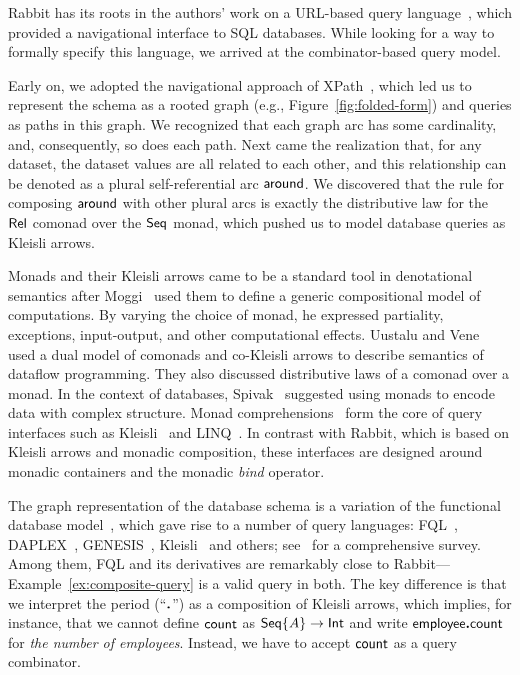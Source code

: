 Rabbit has its roots in the authors' work on a URL-based query
language~\cite{Evans2007}, which provided a navigational interface to SQL
databases.  While looking for a way to formally specify this language, we
arrived at the combinator-based query model.

Early on, we adopted the navigational approach of XPath~\cite{Clark1999}, which
led us to represent the schema as a rooted graph (e.g.,
Figure~\ref{fig:folded-form}) and queries as paths in this graph.  We
recognized that each graph arc has some cardinality, and, consequently, so does
each path.  Next came the realization that, for any dataset, the dataset values
are all related to each other, and this relationship can be denoted as a plural
self-referential arc $\mathsf{around}$.  We discovered that the rule for composing
$\mathsf{around}$ with other plural arcs is exactly the distributive law for the
$\mathsf{Rel}$ comonad over the $\mathsf{Seq}$ monad, which pushed us to model
database queries as Kleisli arrows.

Monads and their Kleisli arrows came to be a standard tool in denotational
semantics after Moggi~\cite{Moggi1991} used them to define a generic
compositional model of computations.  By varying the choice of monad, he
expressed partiality, exceptions, input-output, and other computational
effects.  Uustalu and Vene~\cite{Uustalu2005} used a dual model of comonads and
co-Kleisli arrows to describe semantics of dataflow programming.  They also
discussed distributive laws of a comonad over a monad.  In the context of
databases, Spivak~\cite{Spivak2012} suggested using monads to encode data with
complex structure.  Monad comprehensions~\cite{Trinder1989, Buneman1994} form
the core of query interfaces such as Kleisli~\cite{Wong2000} and
LINQ~\cite{Meijer2006}.  In contrast with Rabbit, which is based on Kleisli
arrows and monadic composition, these interfaces are designed around monadic
containers and the monadic \emph{bind} operator.

The graph representation of the database schema is a variation of the
functional database model~\cite{Kerschberg1976, Sibley1977}, which gave rise to
a number of query languages: FQL~\cite{Buneman1979}, DAPLEX~\cite{Shipman1981},
GENESIS~\cite{Batory1988}, Kleisli~\cite{Wong2000} and others;
see~\cite{Gray2004} for a comprehensive survey.  Among them, FQL and its
derivatives are remarkably close to Rabbit---Example~\ref{ex:composite-query}
is a valid query in both.  The key difference is that we interpret the period
(``$\boldsymbol{.}$'') as a composition of Kleisli arrows, which implies, for instance,
that we cannot define $\mathsf{count}$ as $\mathsf{Seq}{\left\{A\right\}}\to\mathsf{Int}$ and write
$\mathsf{employee}\boldsymbol{.}\mathsf{count}$ for \emph{the number of employees}.  Instead, we have to
accept $\mathsf{count}$ as a query combinator.

